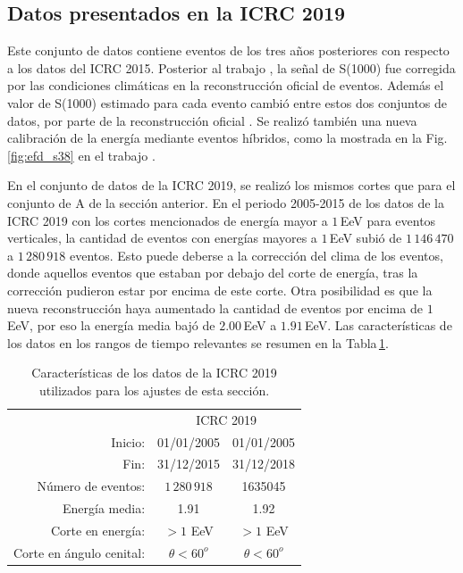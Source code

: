 \subsection{Datos presentados en la ICRC 2019}\label{conjuntoB}

Este conjunto de datos contiene eventos de los tres años posteriores con respecto  a los datos del ICRC 2015. Posterior al trabajo \cite{aab2017impact}, la señal de S(1000) fue corregida por las condiciones climáticas en la reconstrucción oficial de eventos. Además el valor de S(1000) estimado para cada evento cambió entre estos dos conjuntos de datos, por parte de la reconstrucción oficial \cite{isabel}. Se realizó también una nueva calibración de la energía mediante eventos híbridos, como la mostrada en la Fig.\,\ref{fig:efd_s38} en el trabajo  \cite{tobepublished}. 

En el conjunto de datos de la ICRC 2019, se realizó los mismos cortes que para el conjunto de A de la sección anterior. En el periodo 2005-2015 de los datos de la ICRC 2019 con los cortes mencionados de energía mayor a $1\,$EeV para eventos verticales, la cantidad de eventos con energías mayores a $1\,$EeV subió de $1\,146\,470$ a  $1\,280\,918$ eventos. Esto puede deberse a la corrección del clima de los eventos, donde aquellos eventos que estaban por debajo del corte de energía, tras la corrección pudieron estar por encima de este corte. Otra posibilidad es que la nueva reconstrucción haya aumentado la cantidad de eventos por encima de $1\,$EeV, por eso la energía media bajó de $2.00\,$EeV a $1.91\,$EeV.  Las características de los datos en los rangos de tiempo relevantes se resumen en la Tabla\,\ref{tabla:caracteristicas_ICRC_2019}. 

   \begin{table}[H]
       \centering
       \begin{tabular}{r|c|c|}
    \cline{2-3}
                              & \multicolumn{2}{c|}{ICRC 2019} \\ \cline{2-3}
         Inicio:              & 01/01/2005      & 01/01/2005\\
         Fin:                 & 31/12/2015      & 31/12/2018\\  
         Número de eventos:   &  $1\,280\,918$     			    &  1635045     		        \\ 
         Energía media:       &  1.91				        &	1.92				        \\ 
         Corte en energía:    &  $>1$ EeV       		 	    &  $>1$  EeV       		 \\ 
         Corte en ángulo cenital:	&  $\theta<60^o$ 				    & $\theta < 60^o$\\ \cline{2-3}
       \end{tabular}
       \caption{Características de los datos de la ICRC 2019 utilizados para los ajustes de esta sección.} \label{tabla:caracteristicas_ICRC_2019}
   \end{table}


